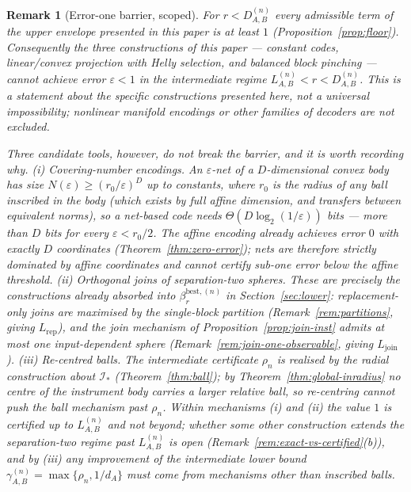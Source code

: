 \documentclass[11pt,a4paper]{article}
\newtheorem{remark}[theorem]{Remark}
\begin{document}
\begin{remark}[Error-one barrier, scoped]
\label{rem:barrier}
For $r<D_{A,B}^{(n)}$ every admissible term of the upper envelope presented in this paper is at least $1$ (Proposition~\ref{prop:floor}). Consequently the three constructions of this paper --- constant codes, linear/convex projection with Helly selection, and balanced block pinching --- cannot achieve error $\varepsilon<1$ in the intermediate regime $L_{A,B}^{(n)}<r<D_{A,B}^{(n)}$. This is a statement about the specific constructions presented here, not a universal impossibility; nonlinear manifold encodings or other families of decoders are not excluded.

Three candidate tools, however, do \emph{not} break the barrier, and it is worth recording why. (i) \emph{Covering-number encodings.} An $\varepsilon$-net of a $D$-dimensional convex body has size $N(\varepsilon)\ge(r_0/\varepsilon)^{D}$ up to constants, where $r_0$ is the radius of any ball inscribed in the body (which exists by full affine dimension, and transfers between equivalent norms), so a net-based code needs $\Theta(D\log_2(1/\varepsilon))$ bits --- more than $D$ bits for every $\varepsilon<r_0/2$. The affine encoding already achieves error $0$ with exactly $D$ coordinates (Theorem~\ref{thm:zero-error}); nets are therefore strictly dominated by affine coordinates and cannot certify sub-one error below the affine threshold. (ii) \emph{Orthogonal joins of separation-two spheres.} These are precisely the constructions already absorbed into $\beta_r^{\mathrm{best},(n)}$ in Section~\ref{sec:lower}: replacement-only joins are maximised by the single-block partition (Remark~\ref{rem:partitions}, giving $L_{\mathrm{rep}}$), and the join mechanism of Proposition~\ref{prop:join-inst} admits at most one input-dependent sphere (Remark~\ref{rem:join-one-observable}, giving $L_{\mathrm{join}}$). (iii) \emph{Re-centred balls.} The intermediate certificate $\rho_n$ is realised by the radial construction about $\mathcal I_*$ (Theorem~\ref{thm:ball}); by Theorem~\ref{thm:global-inradius} no centre of the instrument body carries a larger relative ball, so re-centring cannot push the ball mechanism past $\rho_n$. Within mechanisms (i) and (ii) the value $1$ is certified up to $L_{A,B}^{(n)}$ and not beyond; whether some other construction extends the separation-two regime past $L_{A,B}^{(n)}$ is open (Remark~\ref{rem:exact-vs-certified}(b)), and by (iii) any improvement of the intermediate lower bound $\gamma_{A,B}^{(n)}=\max\{\rho_n,1/d_A\}$ must come from mechanisms other than inscribed balls.
\end{remark}
\end{document}
